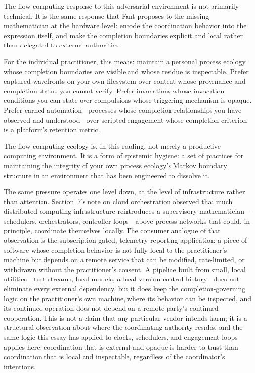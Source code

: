 \documentclass[12pt, a4paper]{article}
\begin{document}
The flow computing response to this adversarial environment is
not primarily technical. It is the same response that Fant
proposes to the missing mathematician at the hardware level:
encode the coordination behavior into the expression itself,
and make the completion boundaries explicit and local rather
than delegated to external authorities.

For the individual practitioner, this means: maintain a personal
process ecology whose completion boundaries are visible and
whose residue is inspectable. Prefer captured wavefronts on
your own filesystem over content whose provenance and completion
status you cannot verify. Prefer invocations whose invocation
conditions you can state over compulsions whose triggering
mechanism is opaque. Prefer earned automation---processes whose
completion relationships you have observed and understood---over
scripted engagement whose completion criterion is a platform's
retention metric.

The flow computing ecology is, in this reading, not merely a
productive computing environment. It is a form of epistemic
hygiene: a set of practices for maintaining the integrity of
your own process ecology's Markov boundary structure in an
environment that has been engineered to dissolve it.

The same pressure operates one level down, at the level of
infrastructure rather than attention. Section~7's note on cloud
orchestration observed that much distributed computing
infrastructure reintroduces a supervisory mathematician---
schedulers, orchestrators, controller loops---above process
networks that could, in principle, coordinate themselves locally.
The consumer analogue of that observation is the
subscription-gated, telemetry-reporting application: a piece of
software whose completion behavior is not fully local to the
practitioner's machine but depends on a remote service that can
be modified, rate-limited, or withdrawn without the practitioner's
consent. A pipeline built from small, local utilities---text
streams, local models, a local version-control history---does not
eliminate every external dependency, but it does keep the
completion-governing logic on the practitioner's own machine,
where its behavior can be inspected, and its continued operation
does not depend on a remote party's continued cooperation. This is
not a claim that any particular vendor intends harm; it is a
structural observation about where the coordinating authority
resides, and the same logic this essay has applied to clocks,
schedulers, and engagement loops applies here: coordination that
is external and opaque is harder to trust than coordination that
is local and inspectable, regardless of the coordinator's
intentions.
\end{document}
